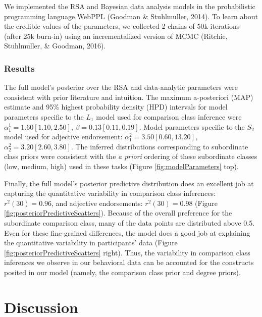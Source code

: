 \documentclass[doc]{apa6}
\begin{document}
We implemented the RSA and Bayesian data analysis models in the
probabilistic programming language WebPPL (Goodman \& Stuhlmuller,
2014). To learn about the credible values of the parameters, we
collected 2 chains of 50k iterations (after 25k burn-in) using an
incrementalized version of MCMC (Ritchie, Stuhlmuller, \& Goodman,
2016).

\subsubsection{Results}

The full model's posterior over the RSA and data-analytic parameters
were consistent with prior literature and intuition. The maximum
a-posteriori (MAP) estimate and 95\% highest probability density (HPD)
intervals for model parameters specific to the \(L_1\) model used for
comparison class inference were \(\alpha^{1}_{1} = 1.60 [1.10, 2.50]\),
\(\beta = 0.13 [0.11, 0.19]\). Model parameters specific to the \(S_2\)
model used for adjective endorsement:
\(\alpha^{2}_{1} = 3.50 [0.60, 13.20]\),
\(\alpha^{2}_{2} = 3.20 [2.60, 3.80]\). The inferred distributions
corresponding to subordinate class priors were consistent with the
\emph{a priori} ordering of these subordinate classes (low, medium,
high) used in these tasks (Figure \ref{fig:modelParameters} top).

Finally, the full model's posterior predictive distribution does an
excellent job at capturing the quantitative variability in comparison
class inferences: \(r^2(30) = 0.96\), and adjective endorsements:
\(r^2(30) = 0.98\) (Figure \ref{fig:posteriorPredictiveScatters}).
Because of the overall preference for the subordinate comparison class,
many of the data points are distributed above 0.5. Even for these
fine-grained differences, the model does a good job at explaining the
quantitative variability in participants' data (Figure
\ref{fig:posteriorPredictiveScatters} right). Thus, the variability in
comparison class inferences we observe in our behavioral data can be
accounted for the constructs posited in our model (namely, the
comparison class prior and degree priors).

\section{Discussion}
\end{document}
